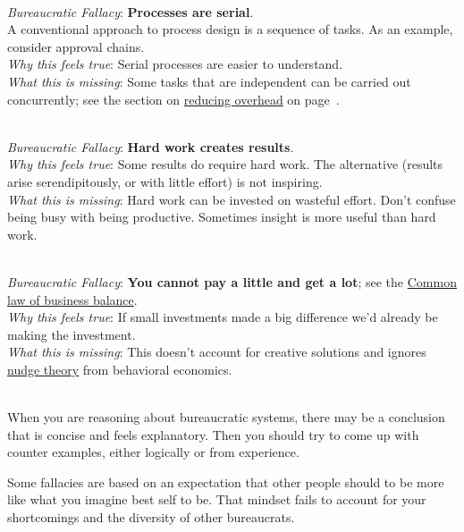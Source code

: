 \ \\
\textit{Bureaucratic Fallacy}: \textbf{Processes are serial}.\\
A conventional approach to process design is a sequence of tasks. As an example, consider approval chains. \\
\textit{Why this feels true}: Serial processes are easier to understand. \\
\textit{What this is missing}: Some tasks that are independent can be carried out concurrently; see the section on \hyperref[sec:reducing-overhead]{reducing overhead} on
page~\pageref{sec:reducing-overhead}.

\ \\
\textit{Bureaucratic Fallacy}: \textbf{Hard work creates results}.\\
\textit{Why this feels true}: Some results do require hard work. The alternative (results arise serendipitously, or with little effort) is not inspiring. \\
\textit{What this is missing}: Hard work can be invested on wasteful effort. Don't confuse being busy with being productive. Sometimes insight is more useful than hard work. 





\ \\
\textit{Bureaucratic Fallacy}: 
\textbf{You cannot pay a little and get a lot}; see the \href{https://en.wikipedia.org/wiki/Common_law_of_business_balance}{Common law of business balance}. 
 \\
\textit{Why this feels true}: If small investments made a big difference we'd already be making the investment.\\
\textit{What this is missing}: This doesn't account for creative solutions and ignores \href{https://en.wikipedia.org/wiki/Nudge_theory}{nudge theory}
from behavioral economics. 

\ \\

When you are reasoning about bureaucratic systems, there may be a conclusion that is concise and feels explanatory. Then you should try to come up with counter examples, either logically or from experience.  

Some fallacies are based on an expectation that other people should to be more like what you imagine best self to be. That mindset fails to account for your  shortcomings and the diversity of other bureaucrats. 

